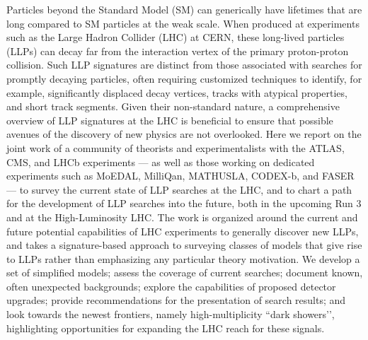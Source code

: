 Particles beyond the Standard Model (SM) can generically have lifetimes that are long compared to SM particles at the weak scale.
When produced at experiments such as the Large Hadron Collider (LHC) at CERN, these long-lived particles (LLPs) can decay far from the interaction vertex of the primary proton-proton collision.
Such LLP signatures are distinct from those associated with searches for promptly decaying particles, often requiring customized techniques to identify, for example, significantly displaced decay vertices, tracks with atypical properties, and short track segments.
Given their non-standard nature, a comprehensive overview of LLP signatures at the LHC is beneficial to ensure that possible avenues of the discovery of new physics are not overlooked.
Here we report on the joint work of a community of theorists and experimentalists with the ATLAS, CMS, and LHCb experiments --- as well as those working on dedicated experiments such as MoEDAL, MilliQan, MATHUSLA, CODEX-b, and FASER --- to survey the current state of LLP searches at the LHC, and to chart a path for the development of LLP searches into the future, both in the upcoming Run 3 and at the High-Luminosity LHC.
The work is organized around the current and future potential capabilities of LHC experiments to generally discover new LLPs, and takes a signature-based approach to surveying classes of models that give rise to LLPs rather than emphasizing any particular theory motivation.
We develop a set of simplified models; assess the coverage of current searches; document known, often unexpected backgrounds; explore the capabilities of proposed detector upgrades; provide recommendations for the presentation of search results; and look towards the newest frontiers, namely high-multiplicity ``dark showers’', highlighting opportunities for expanding the LHC reach for these signals.
